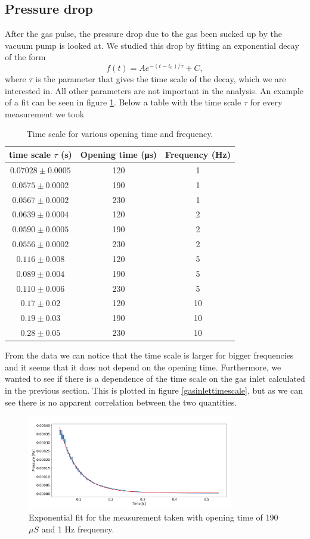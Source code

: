 \documentclass[a4paper,10pt]{article}
\begin{document}
\subsection{Pressure drop}
After the gas pulse, the pressure drop due to the gas been sucked up by the vacuum pump is looked at. We studied this drop by fitting an exponential decay of the form
\[f(t) = Ae^{-(t - t_0)/\tau} + C,\]
where $\tau$ is the parameter that gives the time scale of the decay, which we are interested in. All other parameters are not important in the analysis. An example of a fit can be seen in figure \ref{expfit}. Below a table with the time scale $\tau$ for every measurement we took
\begin{table}[H]
\centering
\caption{Time scale for various opening time and frequency. }
\begin{tabular}{ccc} \toprule
    time scale $\tau$ (s) & Opening time (\si{\micro \s}) & Frequency (\si{\hertz}) \\ \midrule
$0.07028 \pm 0.0005 $& 120& 1\\
$0.0575 \pm 0.0002$& 190& 1\\

$0.0567 \pm 0.0002$& 230& 1\\\midrule
$0.0639 \pm 0.0004$& 120& 2\\
$0.0590 \pm 0.0005$& 190& 2\\
$0.0556 \pm 0.0002 $& 230& 2\\ \midrule
$0.116 \pm 0.008$& 120& 5\\
$0.089 \pm 0.004$ & 190& 5\\ 
$0.110 \pm  0.006$ & 230& 5\\\midrule
$0.17 \pm  0.02$& 120& 10\\ 
$0.19 \pm 0.03$ & 190& 10\\
$0.28 \pm 0.05 $ & 230& 10\\ \bottomrule
\end{tabular}
\end{table}
From the data we can notice that the time scale is larger for bigger frequencies and it seems that it does not depend on the opening time. Furthermore, we wanted to see if there is a dependence of the time scale on the gas inlet calculated in the previous section. This is plotted in figure \ref{gasinlettimescale}, but as we can see there is no apparent correlation between the two quantities.

\begin{figure}[H]
\centering
\includegraphics[width = 0.8\textwidth]{expfit}
\caption{Exponential fit for the measurement taken with opening time of 190 $\mu S$ and 1 Hz frequency.}\label{expfit}
\end{figure}
\end{document}
